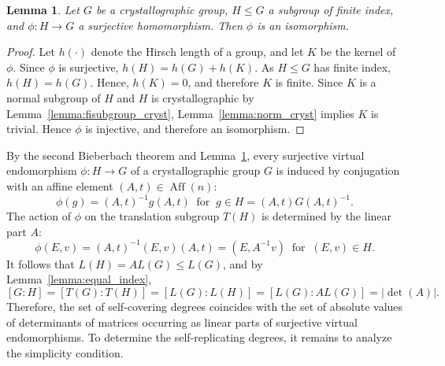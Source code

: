 \documentclass[draft]{adm-paper}
\newtheorem{lemma}[theorem]{Lemma}
\theoremstyle{definition}
\begin{document}
\begin{lemma}\label{lemma:surjection-is-bijection}
Let $G$ be a crystallographic group, $H\le G$ a subgroup of finite index, and $\phi:H\rightarrow G$ a surjective homomorphism. Then $\phi$ is an isomorphism.
\end{lemma}
\begin{proof}
Let $h(\cdot)$ denote the Hirsch length of a group, and let $K$ be the kernel of $\phi$. Since $\phi$ is surjective,
$h(H)=h(G)+h(K)$. As $H\le G$ has finite index, $h(H)=h(G)$. Hence, $h(K)=0$, and therefore $K$ is finite. Since $K$
is a normal subgroup of $H$ and $H$ is crystallographic by Lemma~\ref{lemma:fisubgroup_cryst},
Lemma~\ref{lemma:norm_cryst} implies $K$ is trivial. Hence $\phi$ is injective, and therefore an isomorphism.
\end{proof}

By the second Bieberbach theorem and Lemma~\ref{lemma:surjection-is-bijection}, every surjective virtual endomorphism $\phi:
H \rightarrow G$ of a crystallographic group $G$ is induced by conjugation with an affine element $(A, t) \in \operatorname{Aff}(n)$:
\[
\phi(g) = (A, t)^{-1}g(A, t)  \ \mbox{ for } \ g\in H = (A, t)G(A, t)^{-1}.
\]
The action of $\phi$ on the translation subgroup $T(H)$ is determined by the linear part $A$:
\[
\phi(E,v)=(A, t)^{-1}(E,v)(A, t)=(E,A^{-1}v) \ \mbox{ for } \ (E,v)\in H.
\]
It follows that $L(H) = AL(G)\le L(G)$, and by Lemma~\ref{lemma:equal_index},
\[
[G:H]=[T(G):T(H)]=[L(G):L(H)]=[L(G):AL(G)]=|\det(A)|.
\]
Therefore, the set of self-covering degrees coincides with the set of absolute values of determinants of matrices
occurring as linear parts of surjective virtual endomorphisms. To determine the self-replicating degrees, it remains
to analyze the simplicity condition.
\end{document}
